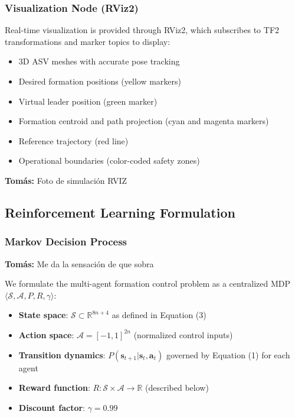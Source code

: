 \documentclass[preprint,3p]{elsarticle}
\newcommand{\tcom}[1]{{ \color{blue}\textbf{Tomás:} #1}}
\begin{document}
\subsubsection{Visualization Node (RViz2)}

Real-time visualization is provided through RViz2, which subscribes to TF2 transformations and marker topics to display:
\begin{itemize}
    \item 3D ASV meshes with accurate pose tracking
    \item Desired formation positions (yellow markers)
    \item Virtual leader position (green marker)
    \item Formation centroid and path projection (cyan and magenta markers)
    \item Reference trajectory (red line)
    \item Operational boundaries (color-coded safety zones)
\end{itemize}

\tcom{Foto de simulación RVIZ}

\subsection{Reinforcement Learning Formulation}

\vspace{1em}

\subsubsection{Markov Decision Process}

\tcom{Me da la sensación de que sobra}

We formulate the multi-agent formation control problem as a centralized MDP $\langle \mathcal{S}, \mathcal{A}, P, R, \gamma \rangle$:

\begin{itemize}
    \item \textbf{State space}: $\mathcal{S} \subset \mathbb{R}^{8n+4}$ as defined in Equation (3)
    \item \textbf{Action space}: $\mathcal{A} = [-1, 1]^{2n}$ (normalized control inputs)
    \item \textbf{Transition dynamics}: $P(\mathbf{s}_{t+1}|\mathbf{s}_t, \mathbf{a}_t)$ governed by Equation (1) for each agent
    \item \textbf{Reward function}: $R: \mathcal{S} \times \mathcal{A} \rightarrow \mathbb{R}$ (described below)
    \item \textbf{Discount factor}: $\gamma = 0.99$
\end{itemize}
\end{document}

